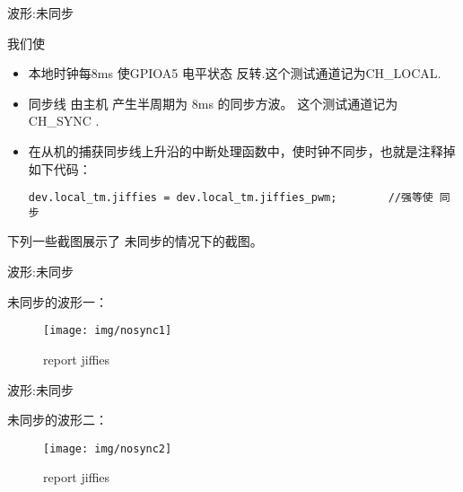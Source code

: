 \begin{frame}[fragile]{波形:未同步}

我们使
\begin{itemize}
  \item 本地时钟每8ms 使GPIOA5 电平状态 反转.这个测试通道记为CH\_LOCAL.
  \item 同步线 由主机 产生半周期为 8ms 的同步方波。 这个测试通道记为CH\_SYNC .
  \item 在从机的捕获同步线上升沿的中断处理函数中，使时钟不同步，也就是注释掉如下代码：
  \begin{lstlisting}
dev.local_tm.jiffies = dev.local_tm.jiffies_pwm;		//强等使 同步
  \end{lstlisting}

\end{itemize}


下列一些截图展示了 未同步的情况下的截图。



\end{frame}


\begin{frame}[fragile]{波形:未同步}

未同步的波形一\label{nosyncwave1}：

  \begin{figure}[htbp]
  \begin{center}
  \texttt{[image: img/nosync1]}
  \caption{report jiffies}
  \label{report}
  \end{center}
  \vspace{-0.5em}
  \end{figure}


\end{frame}



\begin{frame}[fragile]{波形:未同步}

未同步的波形二：

  \begin{figure}[htbp]
  \begin{center}
  \texttt{[image: img/nosync2]}
  \caption{report jiffies}
  \label{report}
  \end{center}
  \vspace{-0.5em}
  \end{figure}


\end{frame}


